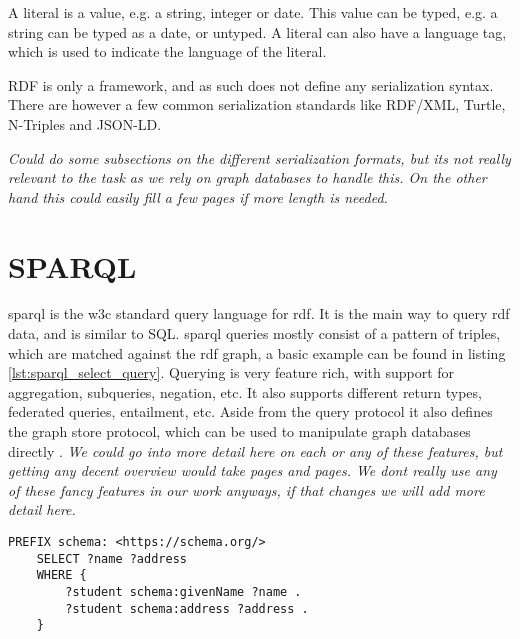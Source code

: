 A literal is a value, e.g. a string, integer or date. This value can be typed, e.g. a string can be typed as a date, or untyped. A literal can also have a language tag, which is used to indicate the language of the literal.

RDF is only a framework, and as such does not define any serialization syntax. There are however a few common serialization standards like RDF/XML, Turtle, N-Triples and JSON-LD. 

\textit{Could do some subsections on the different serialization formats, but its not really relevant to the task as we rely on graph databases to handle this. On the other hand this could easily fill a few pages if more length is needed.}

\section{SPARQL}
\acrfull{sparql} is the \acrshort{w3c} standard query language for \acrshort{rdf}. It is the main way to query \acrshort{rdf} data, and is similar to SQL. \acrshort{sparql} queries mostly consist of a pattern of triples, which are matched against the \acrshort{rdf} graph, a basic example can be found in listing \ref{lst:sparql_select_query}. Querying is very feature rich, with support for aggregation, subqueries, negation, etc. It also supports different return types, federated queries, entailment, etc. \citep{SPARQL1.1QL} Aside from the query protocol it also defines the graph store protocol, which can be used to manipulate graph databases directly \citep{SPARQL1.1}. \textit{We could go into more detail here on each or any of these features, but getting any decent overview would take pages and pages. We dont really use any of these fancy features in our work anyways, if that changes we will add more detail here.}

\begin{lstlisting}[language=SPARQL, caption={Example of a basic \acrshort{sparql} SELECT query}, label={lst:sparql_select_query}, captionpos=b]
    PREFIX schema: <https://schema.org/>
    SELECT ?name ?address
    WHERE {
        ?student schema:givenName ?name .
        ?student schema:address ?address .
    }
\end{lstlisting}

